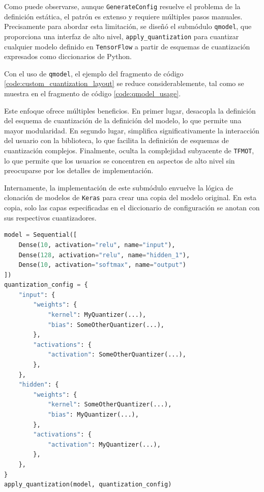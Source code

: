 Como puede observarse, aunque \texttt{GenerateConfig} resuelve el problema de la definición estática, el patrón es extenso y requiere múltiples pasos manuales. Precisamente para abordar esta limitación, se diseñó el submódulo \texttt{qmodel}, que proporciona una interfaz de alto nivel, \texttt{apply\_quantization} \cite{qtensor_qmodel} para cuantizar cualquier modelo definido en \texttt{TensorFlow} a partir de esquemas de cuantización expresados como diccionarios de Python.

Con el uso de \texttt{qmodel}, el ejemplo del fragmento de código \ref{code:custom_cuantization_layout} se reduce considerablemente, tal como se muestra en el fragmento de código \ref{code:qmodel_usage}.

Este enfoque ofrece múltiples beneficios. En primer lugar, desacopla la definición del esquema de cuantización de la definición del modelo, lo que permite una mayor modularidad. En segundo lugar, simplifica significativamente la interacción del usuario con la biblioteca, lo que facilita la definición de esquemas de cuantización complejos. Finalmente, oculta la complejidad subyacente de \texttt{TFMOT}, lo que permite que los usuarios se concentren en aspectos de alto nivel sin preocuparse por los detalles de implementación.

Internamente, la implementación de este submódulo \cite{qtensor_qmodel} envuelve la lógica de clonación de modelos de \texttt{Keras} \cite{tensorflow_clone_model} para crear una copia del modelo original. En esta copia, solo las capas especificadas en el diccionario de configuración se anotan con sus respectivos cuantizadores.

\newpage
\begin{lstlisting}[language=Python,label=code:qmodel_usage,caption=Uso del módulo qmodel para cuantizar un modelo a partir de una descripción de esquema de cuantización.]
model = Sequential([
    Dense(10, activation="relu", name="input"),
    Dense(128, activation="relu", name="hidden_1"),
    Dense(10, activation="softmax", name="output")
])
quantization_config = {
    "input": {
        "weights": {
            "kernel": MyQuantizer(...),
            "bias": SomeOtherQuantizer(...),
        },
        "activations": {
            "activation": SomeOtherQuantizer(...),
        },
    },
    "hidden": {
        "weights": {
            "kernel": SomeOtherQuantizer(...),
            "bias": MyQuantizer(...),
        },
        "activations": {
            "activation": MyQuantizer(...),
        },
    },
}
apply_quantization(model, quantization_config)
\end{lstlisting}

